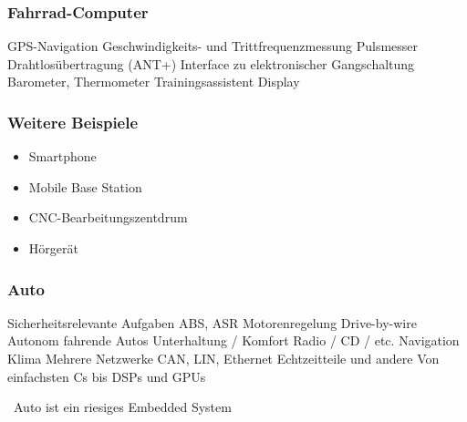 \begin{minipage}[t]{0.48\columnwidth}
    \raggedright
    \subsubsection*{Fahrrad-Computer}

    \begin{outline}
        \1 GPS-Navigation
        \1 Geschwindigkeits- und Trittfrequenzmessung
        \1 Pulsmesser
        \1 Drahtlosübertragung (ANT+)
        \1 Interface zu elektronischer Gangschaltung
        \1 Barometer, Thermometer
        \1 Trainingsassistent
        \1 Display
    \end{outline}

    \subsubsection*{Weitere Beispiele}

    \begin{itemize}
        \item Smartphone
        \item Mobile Base Station
        \item CNC-Bearbeitungszentdrum
        \item Hörgerät
    \end{itemize}
\end{minipage}
\hfill
\begin{minipage}[t]{0.48\columnwidth}
    \raggedright
    \subsubsection*{Auto}

    \begin{outline}
        \1 Sicherheitsrelevante Aufgaben
            \2 ABS, ASR
            \2 Motorenregelung
            \2 Drive-by-wire
            \2 Autonom fahrende Autos
        \1 Unterhaltung / Komfort
            \2 Radio / CD / etc.
            \2 Navigation
            \2 Klima
        \1 Mehrere Netzwerke
            \2 CAN, LIN, Ethernet
        \1 Echtzeitteile und andere
        \1 Von einfachsten \textmu Cs bis DSPs und GPUs 
    \end{outline}

    \textrightarrow\ Auto ist ein riesiges Embedded System
\end{minipage}


